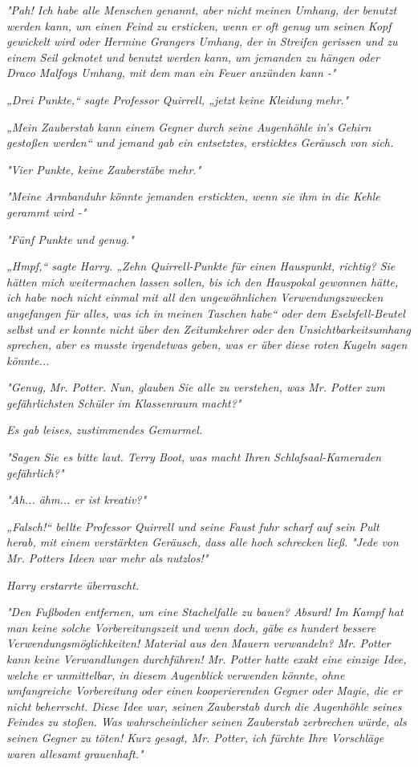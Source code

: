 {\emph{"Pah! Ich habe alle Menschen genannt, aber nicht meinen Umhang, der benutzt werden kann, um einen Feind zu ersticken, wenn er oft genug um seinen Kopf gewickelt wird oder Hermine Grangers Umhang, der in Streifen gerissen und zu einem Seil geknotet und benutzt werden kann, um jemanden zu hängen oder Draco Malfoys Umhang, mit dem man ein Feuer anzünden kann -"}

\emph{„Drei Punkte,“ sagte Professor Quirrell, „jetzt keine Kleidung mehr."}

\emph{„Mein Zauberstab kann einem Gegner durch seine Augenhöhle in's Gehirn gestoßen werden“ und jemand gab ein entsetztes, ersticktes Geräusch von sich.}

\emph{"Vier Punkte, keine Zauberstäbe mehr."}

\emph{"Meine Armbanduhr könnte jemanden erstickten, wenn sie ihm in die Kehle gerammt wird -"}

\emph{"Fünf Punkte und genug."}

\emph{„Hmpf,“ sagte Harry. „Zehn Quirrell-Punkte für einen Hauspunkt, richtig? Sie hätten mich weitermachen lassen sollen, bis ich den Hauspokal gewonnen hätte, ich habe noch nicht einmal mit all den ungewöhnlichen Verwendungszwecken angefangen für alles, was ich in meinen Taschen habe“ oder dem Eselsfell-Beutel selbst und er konnte nicht über den Zeitumkehrer oder den Unsichtbarkeitsumhang sprechen, aber es musste} \emph{\emph{irgendetwas}} \emph{geben, was er über diese roten Kugeln sagen könnte...}

\emph{"\emph{Genug,}} \emph{Mr. Potter. Nun, glauben Sie alle zu verstehen, was Mr. Potter zum gefährlichsten Schüler im Klassenraum macht?"}

\emph{Es gab leises, zustimmendes Gemurmel.}

\emph{"Sagen Sie es bitte laut. Terry Boot, was macht Ihren} \emph{Schlafsaal-Kameraden} \emph{gefährlich?"}

\emph{"Ah... ähm... er ist kreativ?"}

\emph{„\emph{Falsch!}“ bellte Professor Quirrell und seine Faust fuhr scharf auf sein Pult} \emph{herab, mit einem verstärkten Geräusch, dass alle hoch schrecken ließ.} \emph{"Jede von Mr. Potters Ideen war mehr als nutzlos!"}

\emph{Harry erstarrte überrascht.}

\emph{"Den Fußboden entfernen, um eine Stachelfalle zu bauen? Absurd! Im} \emph{Kampf hat man keine solche Vorbereitungszeit und wenn doch, gäbe es hundert bessere Verwendungsmöglichkeiten! Material aus den Mauern verwandeln? Mr. Potter kann keine Verwandlungen durchführen! Mr. Potter hatte exakt eine einzige Idee, welche er unmittelbar, in diesem Augenblick verwenden könnte, ohne umfangreiche Vorbereitung oder einen kooperierenden Gegner oder Magie, die er nicht beherrscht. Diese Idee war, seinen Zauberstab durch die Augenhöhle seines Feindes zu stoßen. Was wahrscheinlicher seinen Zauberstab zerbrechen würde, als seinen Gegner zu töten! Kurz gesagt, Mr. Potter, ich fürchte Ihre Vorschläge waren allesamt grauenhaft."}

}
